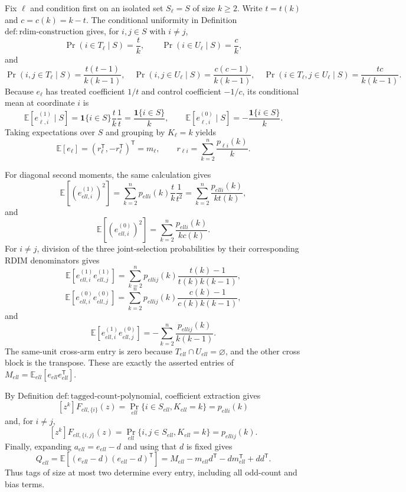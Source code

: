 Fix \(\ell\) and condition first on an isolated set \(S_{\ell}=S\) of size \(k\ge2\).  Write \(t=t(k)\) and \(c=c(k)=k-t\).  The conditional uniformity in Definition \(\mathrm{def:rdim\mbox{-}construction}\) gives, for \(i,j\in S\) with \(i\ne j\),
\[
 \Pr(i\in T_{\ell}\mid S)=\frac tk,
 \qquad
 \Pr(i\in U_{\ell}\mid S)=\frac ck,
\]
and
\[
 \Pr(i,j\in T_{\ell}\mid S)=\frac{t(t-1)}{k(k-1)},
 \quad
 \Pr(i,j\in U_{\ell}\mid S)=\frac{c(c-1)}{k(k-1)},
 \quad
 \Pr(i\in T_{\ell},j\in U_{\ell}\mid S)=\frac{tc}{k(k-1)}.
\]
Because \(e_{\ell}\) has treated coefficient \(1/t\) and control coefficient \(-1/c\), its conditional mean at coordinate \(i\) is
\[
 \mathbb E[e_{\ell,i}^{(1)}\mid S]
 =\mathbf 1\{i\in S\}\frac tk\frac1t
 =\frac{\mathbf 1\{i\in S\}}k,
 \qquad
 \mathbb E[e_{\ell,i}^{(0)}\mid S]
 =-\frac{\mathbf 1\{i\in S\}}k.
\]
Taking expectations over \(S\) and grouping by \(K_{\ell}=k\) yields
\[
 \mathbb E[e_{\ell}]
 =(r_{\ell}^{\mathsf T},-r_{\ell}^{\mathsf T})^{\mathsf T}
 =m_{\ell},
 \qquad
 r_{\ell i}=\sum_{k=2}^n\frac{p_{\ell i}(k)}k.
\]

For diagonal second moments, the same calculation gives
\[
 \mathbb E[(e_{ell,i}^{(1)})^2]
 =\sum_{k=2}^n p_{ell i}(k)\frac tk\frac1{t^2}
 =\sum_{k=2}^n\frac{p_{ell i}(k)}{k t(k)},
\]
and
\[
 \mathbb E[(e_{ell,i}^{(0)})^2]
 =\sum_{k=2}^n\frac{p_{ell i}(k)}{k c(k)}.
\]
For \(i\ne j\), division of the three joint-selection probabilities by their corresponding RDIM denominators gives
\[
 \mathbb E[e_{ell,i}^{(1)}e_{ell,j}^{(1)}]
 =\sum_{k=2}^n p_{ell ij}(k)
   \frac{t(k)-1}{t(k)k(k-1)},
\]
\[
 \mathbb E[e_{ell,i}^{(0)}e_{ell,j}^{(0)}]
 =\sum_{k=2}^n p_{ell ij}(k)
   \frac{c(k)-1}{c(k)k(k-1)},
\]
and
\[
 \mathbb E[e_{ell,i}^{(1)}e_{ell,j}^{(0)}]
 =-\sum_{k=2}^n\frac{p_{ell ij}(k)}{k(k-1)}.
\]
The same-unit cross-arm entry is zero because \(T_{ell}\cap U_{ell}=\varnothing\), and the other cross block is the transpose.  These are exactly the asserted entries of \(M_{ell}=\mathbb E_{ell}[e_{ell}e_{ell}^{\mathsf T}]\).

By Definition \(\mathrm{def:tagged\mbox{-}count\mbox{-}polynomial}\), coefficient extraction gives
\[
 [z^k]F_{ell,\{i\}}(z)
 =\Pr_{ell}\{i\in S_{ell},K_{ell}=k\}=p_{ell i}(k)
\]
and, for \(i\ne j\),
\[
 [z^k]F_{ell,\{i,j\}}(z)
 =\Pr_{ell}\{i,j\in S_{ell},K_{ell}=k\}=p_{ell ij}(k).
\]
Finally, expanding \(a_{ell}=e_{ell}-d\) and using that \(d\) is fixed gives
\[
 Q_{ell}
 =\mathbb E[(e_{ell}-d)(e_{ell}-d)^{\mathsf T}]
 =M_{ell}-m_{ell}d^{\mathsf T}-dm_{ell}^{\mathsf T}+dd^{\mathsf T}.
\]
Thus tags of size at most two determine every entry, including all odd-count and bias terms.

